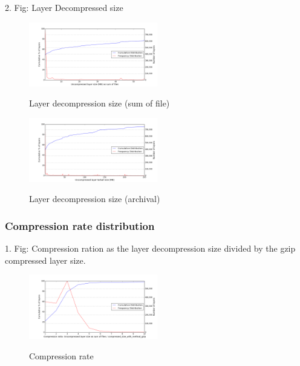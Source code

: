 2. Fig: Layer Decompressed size

\begin{figure}
	\centering
	\includegraphics[width=0.5\textwidth]{graphs/distributionUncompressed_layer_size_(MB)_as_sum_of_files.png}\\
	\caption{Layer decompression size (sum of file)}\label{fig_image_size_compression}
\end{figure}

\begin{figure}
	\centering
	\includegraphics[width=0.5\textwidth]{graphs/distributionUncompressed_layer_tarball_size_(MB).png}\\
	\caption{Layer decompression size (archival)}\label{fig_image_size_compression}
\end{figure}

\subsubsection{Compression rate distribution}

1. Fig: Compression ration as the layer decompression size divided by the gzip compressed layer size.

\begin{figure}
	\centering
	\includegraphics[width=0.5\textwidth]{graphs/distributionCompression_ratio_Uncompressed_layer_size_as_sum_of_files_divided_by_compressed_size_with_method_gzip.png}\\
	\caption{Compression rate}\label{fig_image_size_compression}
\end{figure}

